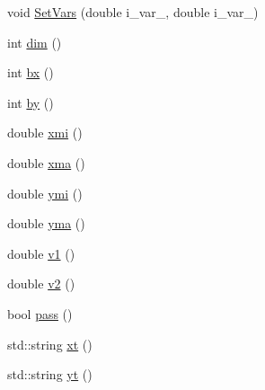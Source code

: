 \begin{DoxyCompactItemize}
void \hyperlink{classCuts_ad0f0d1027a88184208e4514e57850860}{Set\-Vars} (double i\-\_\-var\-\_, double i\-\_\-var\-\_)
\item 
int \hyperlink{classCuts_abad4ce6f1a78c616b24447bfc5e13d02}{dim} ()
\item 
int \hyperlink{classCuts_a47e062067996240269bdaece2ca22d20}{bx} ()
\item 
int \hyperlink{classCuts_a0d43b72943c442c0d871349cc9236a0f}{by} ()
\item 
double \hyperlink{classCuts_a423445a2a577e2c196f293f3afacc2cc}{xmi} ()
\item 
double \hyperlink{classCuts_acd8d05dc99b2a5346f7f514bf53a2a27}{xma} ()
\item 
double \hyperlink{classCuts_a095895dd4a9e28d949d5e2dab5c187a8}{ymi} ()
\item 
double \hyperlink{classCuts_a8a78fea1f43641ab4ef7ff9f054b66de}{yma} ()
\item 
double \hyperlink{classCuts_a5ff775fc4b80018af874c2a22f320929}{v1} ()
\item 
double \hyperlink{classCuts_a7df198487a1a1233588252dd4cc79f6b}{v2} ()
\item 
bool \hyperlink{classCuts_a700da84c03e0c27c4c3ca2746c214e31}{pass} ()
\item 
std\-::string \hyperlink{classCuts_ab49b5fd5a9a35d4950ade6b70098dfe0}{xt} ()
\item 
std\-::string \hyperlink{classCuts_a6c9b325003c1036f32872d3864ea1750}{yt} ()
\end{DoxyCompactItemize}
